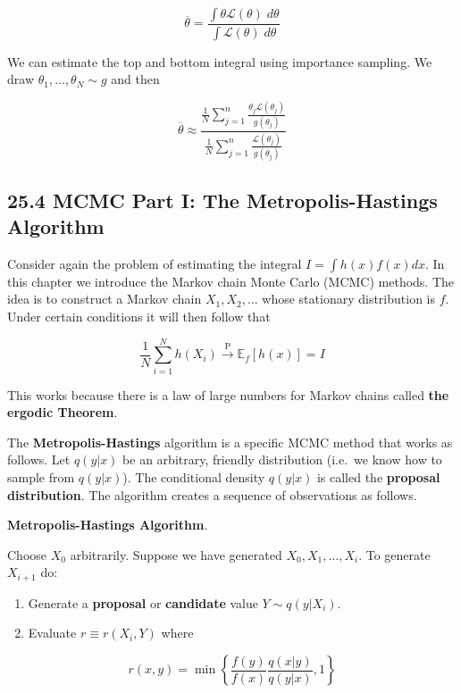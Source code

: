 \[ \overline{\theta} = \frac{\int \theta \mathcal{L}(\theta) \; d\theta }{\int \mathcal{L}(\theta) \; d\theta} \]

We can estimate the top and bottom integral using importance sampling.
We draw \(\theta_{1}, \dots, \theta_N \sim g\) and then

\[ \overline{\theta} \approx \frac{ \frac{1}{N} \sum_{j=1}^{n} \frac{\theta_{j} \mathcal{L}(\theta_{j})}{g(\theta_{j})}}{\frac{1}{N} \sum_{j=1}^{n} \frac{\mathcal{L}(\theta_{j})}{g(\theta_{j})}} \]


\subsection*{25.4 MCMC Part I: The Metropolis-Hastings
Algorithm}\label{mcmc-part-i-the-metropolis-hastings-algorithm}

Consider again the problem of estimating the integral
\(I = \int h(x) f(x) dx\). In this chapter we introduce the Markov chain
Monte Carlo (MCMC) methods. The idea is to construct a Markov chain
\(X_{1}, X_{2}, \dots\) whose stationary distribution is \(f\). Under
certain conditions it will then follow that

\[ \frac{1}{N} \sum_{i=1}^N h(X_{i}) \xrightarrow{\text{P}} \mathbb{E}_f[h(x)] = I \]

This works because there is a law of large numbers for Markov chains
called \textbf{the ergodic Theorem}.

The \textbf{Metropolis-Hastings} algorithm is a specific MCMC method
that works as follows. Let \(q(y | x)\) be an arbitrary, friendly
distribution (i.e.~we know how to sample from \(q(y | x)\)). The
conditional density \(q(y | x)\) is called the \textbf{proposal
distribution}. The algorithm creates a sequence of observations as
follows.

\textbf{Metropolis-Hastings Algorithm}.

Choose \(X_{0}\) arbitrarily. Suppose we have generated
\(X_{0}, X_{1}, \dots, X_{i}\). To generate \(X_{i+1}\) do:

\begin{enumerate}[tightlist,label={\arabic*.}]
\item
  Generate a \textbf{proposal} or \textbf{candidate} value
  \(Y \sim q(y | X_{i})\).
\item
  Evaluate \(r \equiv r(X_{i}, Y)\) where
\end{enumerate}

\[ r(x, y) = \min \left\{ \frac{f(y)}{f(x)} \frac{q(x | y)}{q(y | x)}, 1 \right\} \]

